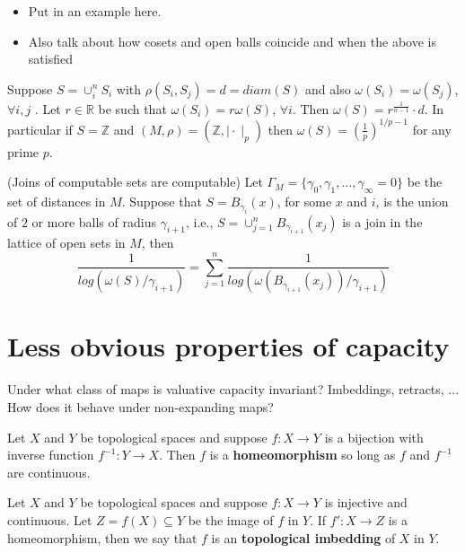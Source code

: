 \begin{itemize}
\item Put in an example here.
\item Also talk about how cosets and open balls coincide and when the above is satisfied 
\end{itemize}

\begin{corollary*}
	Suppose $S = \cup_i^n S_i$ with $\rho(S_i, S_j)=d=diam(S)$ and also $\omega(S_i)=\omega(S_j)$, $\forall i,j$ .  Let $r \in \mathbb{R}$ be such that $\omega(S_i)=r\omega(S)$, $\forall i$. Then $\omega(S) = r^{\frac{1}{n-1}}\cdot d$. In particular if $S = \mathbb{Z}$ and $(M,\rho)= (\mathbb{Z}, \mid \cdot\mid_p)$ then $\omega(S)=(\frac{1}{p})^{1/p-1}$ for any prime $p$. 
\end{corollary*}

\begin{corollary*}
	(Joins of computable sets are computable) Let  $\Gamma_M = \{\gamma_0, \gamma_1,\ldots, \gamma_\infty=0\}$ be the set of distances in $M$. Suppose that $S = B_{\gamma_i}(x)$,  for some $x$ and $i$, is the union of $2$ or more balls of radius $\gamma_{i+1}$, i.e., $S=\cup_{j=1}^n B_{\gamma_{i+1}} (x_j)$ is a join in the lattice of open sets in $M$, then 
	\[\frac{1}{log(\omega(S)/\gamma_{i+1} )} = \sum_{j=1}^n \frac{1}{log(\omega(B_{\gamma_{i+1}}(x_j))/\gamma_{i+1} )}\]
\end{corollary*}

\newpage
\section*{Less obvious properties of capacity}
Under what class of maps is valuative capacity invariant? Imbeddings, retracts, ... How does it behave under non-expanding maps?
\begin{definition*}
Let $X$ and $Y$ be topological spaces and suppose $f: X \rightarrow Y$ is a bijection with inverse function $f^{-1}: Y \rightarrow X$. Then $f$ is a \textbf{homeomorphism} so long as $f$ and $f^{-1}$ are continuous.
\end{definition*}

\begin{definition*}
Let $X$ and $Y$ be topological spaces and suppose $f: X \rightarrow Y$ is injective and continuous. Let $Z =f(X) \subseteq Y$ be the image of $f$ in $Y$. If $f': X \rightarrow Z$ is a homeomorphism, then we say that $f$ is an \textbf{topological imbedding} of $X$ in $Y$.
\end{definition*}

